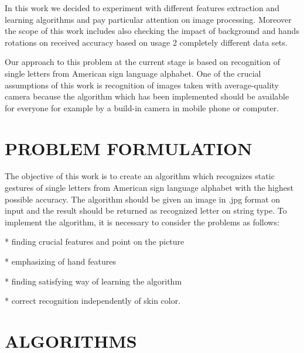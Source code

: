 \documentclass[11pt,a4paper]{article}
\begin{document}
	In this work we decided to experiment with different features extraction and learning algorithms and pay particular attention on image processing. Moreover the scope of this work includes also checking the impact of background and hands rotations on received accuracy based on usage 2 completely different data sets.
	
	Our approach to this problem at the current stage is based on recognition of single letters from American sign language alphabet. One of the crucial assumptions of this work is recognition of images taken with average-quality camera because the algorithm which has been implemented should be available for everyone for example by a build-in camera in mobile phone or computer.
	
	
	
	
	

	

\section{PROBLEM FORMULATION}

	The objective of this work is to create an algorithm which recognizes static gestures of single letters from American sign language alphabet with the highest possible accuracy. The algorithm should be given an image in .jpg format on input and the result should be returned as recognized letter on string type. To implement the algorithm, it is necessary to consider the problems as follows:
	
* finding crucial features and point on the picture

* emphasizing of hand features
	
* finding satisfying way of learning the algorithm
	
* correct recognition independently of skin color.









\section{ALGORITHMS}
\end{document}

